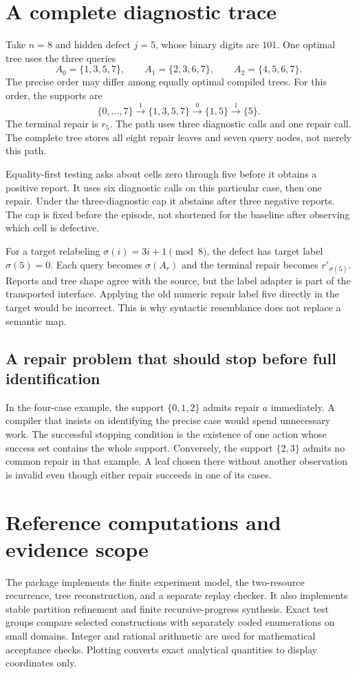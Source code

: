 \documentclass[11pt,letterpaper]{article}
\theoremstyle{plain}
\theoremstyle{definition}
\begin{document}
\clearpage\appendix
\section{A complete diagnostic trace}\label{app:trace}
Take $n=8$ and hidden defect $j=5$, whose binary digits are $101$. One optimal tree uses the three queries
\[
A_0=\{1,3,5,7\},\qquad A_1=\{2,3,6,7\},\qquad A_2=\{4,5,6,7\}.
\]
The precise order may differ among equally optimal compiled trees. For this order, the supports are
\[
\{0,\ldots,7\}\xrightarrow{1}\{1,3,5,7\}
\xrightarrow{0}\{1,5\}\xrightarrow{1}\{5\}.
\]
The terminal repair is $r_5$. The path uses three diagnostic calls and one repair call. The complete tree stores all eight repair leaves and seven query nodes, not merely this path.

Equality-first testing asks about cells zero through five before it obtains a positive report. It uses six diagnostic calls on this particular case, then one repair. Under the three-diagnostic cap it abstains after three negative reports. The cap is fixed before the episode, not shortened for the baseline after observing which cell is defective.

For a target relabeling $\sigma(i)=3i+1\pmod8$, the defect has target label $\sigma(5)=0$. Each query becomes $\sigma(A_r)$ and the terminal repair becomes $r'_{\sigma(5)}$. Reports and tree shape agree with the source, but the label adapter is part of the transported interface. Applying the old numeric repair label five directly in the target would be incorrect. This is why syntactic resemblance does not replace a semantic map.

\subsection{A repair problem that should stop before full identification}
In the four-case example, the support $\{0,1,2\}$ admits repair $a$ immediately. A compiler that insists on identifying the precise case would spend unnecessary work. The successful stopping condition is the existence of one action whose success set contains the whole support. Conversely, the support $\{2,3\}$ admits no common repair in that example. A leaf chosen there without another observation is invalid even though either repair succeeds in one of its cases.

\section{Reference computations and evidence scope}\label{app:checks}
The package implements the finite experiment model, the two-resource recurrence, tree reconstruction, and a separate replay checker. It also implements stable partition refinement and finite recursive-progress synthesis. Exact test groups compare selected constructions with separately coded enumerations on small domains. Integer and rational arithmetic are used for mathematical acceptance checks. Plotting converts exact analytical quantities to display coordinates only.
\end{document}
